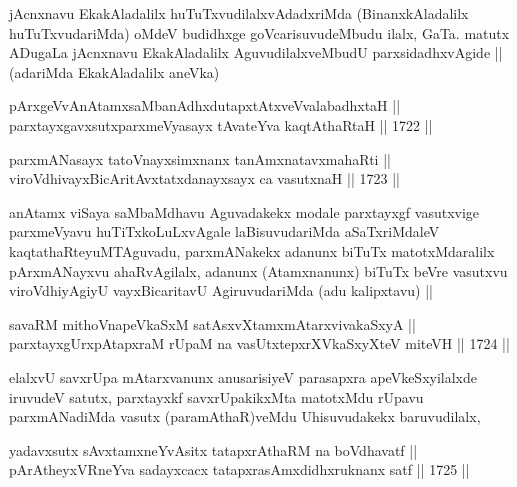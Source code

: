 \begin{artha}
jAcnxnavu EkakAladalilx huTuTxvudilalxvAdadxriMda (BinanxkAladalilx
huTuTxvudariMda) oMdeV budidhxge goVcarisuvudeMbudu ilalx,
GaTa. matutx ADugaLa jAcnxnavu EkakAladalilx AguvudilalxveMbudU
parxsidadhxvAgide || (adariMda EkakAladalilx aneVka)
\end{artha}


\begin{shl}
pArxgeVvAnAtamxsaMbanAdhxdutapxtAtxveVvalabadhxtaH || \\
parxtayxgavxsutxparxmeVyasayx tAvateYva kaqtAthaRtaH ||  1722 || 
\end{shl}
				
\begin{shl}
parxmANasayx tatoV\s nayxsimxnanx tanAmxnatavxmahaRti ||  \\
viroVdhivayxBicAritAvxtatxdanayxsayx ca vasutxnaH ||  1723 ||  
\end{shl}

\begin{artha}
anAtamx viSaya saMbaMdhavu Aguvadakekx modale parxtayxgf vasutxvige
parxmeVyavu huTiTxkoLuLxvAgale laBisuvudariMda aSaTxriMdaleV
kaqtathaRteyuMTAguvadu, parxmANakekx adanunx biTuTx matotxMdaralilx
pArxmANayxvu ahaRvAgilalx, adanunx (Atamxnanunx) biTuTx beVre vasutxvu
viroVdhiyAgiyU vayxBicaritavU AgiruvudariMda (adu kalipxtavu) ||
\end{artha}

\begin{shl}
savaRM mithoV\s napeVkaSxM satAsxvXtamxmAtarxvivakaSxyA || \\
parxtayxgUrxpAtapxraM rUpaM na vasUtxtepxrXVkaSxyXteV miteVH ||  1724 ||  
\end{shl}

\begin{artha}
elalxvU savxrUpa mAtarxvanunx anusarisiyeV parasapxra apeVkeSxyilalxde
iruvudeV satutx, parxtayxkf savxrUpakikxMta matotxMdu rUpavu
parxmANadiMda vasutx (paramAthaR)veMdu Uhisuvudakekx baruvudilalx,
\end{artha}



\begin{shl}
yadavxsutx sAvxtamxneYvAsitx tatapxrAthaRM na boVdhavatf || \\
pArAtheyxVRneYva sadayxcacx tatapxrasAmxdidhxruknanx satf ||  1725 ||  
\end{shl}

